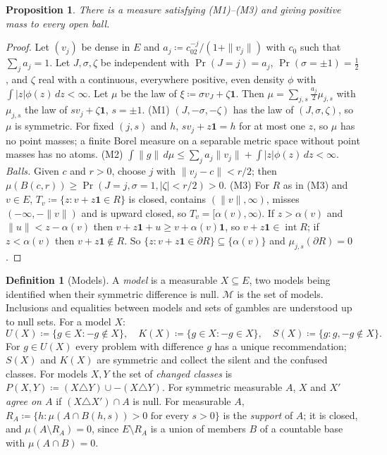 \documentclass[11pt]{article}
\newtheorem{proposition}[theorem]{Proposition}
\theoremstyle{definition}
\newtheorem{definition}[theorem]{Definition}
\theoremstyle{remark}
\newcommand{\M}{\mathcal M}
\newcommand{\one}{\mathbf 1}
\newcommand{\interior}{\operatorname{int}}
\newcommand{\bd}{\partial}
\begin{document}
\begin{proposition}\label{prop:existence-measure}
There is a measure satisfying (M1)--(M3) and giving positive mass to every open ball.
\end{proposition}
\begin{proof}
Let $(v_j)$ be dense in $E$ and $a_j\coloneqq c_02^{-j}/(1+\|v_j\|)$ with $c_0$ such that $\sum_ja_j=1$. Let $J,\sigma,\zeta$ be independent with $\Pr(J=j)=a_j$, $\Pr(\sigma=\pm1)=\frac12$, and $\zeta$ real with a continuous, everywhere positive, even density $\phi$ with $\int|z|\phi(z)\,dz<\infty$. Let $\mu$ be the law of $\xi\coloneqq\sigma v_J+\zeta\one$. Then $\mu=\sum_{j,s}\frac{a_j}2\mu_{j,s}$ with $\mu_{j,s}$ the law of $sv_j+\zeta\one$, $s=\pm1$.
(M1) $(J,-\sigma,-\zeta)$ has the law of $(J,\sigma,\zeta)$, so $\mu$ is symmetric. For fixed $(j,s)$ and $h$, $sv_j+z\one=h$ for at most one $z$, so $\mu$ has no point masses; a finite Borel measure on a separable metric space without point masses has no atoms.
(M2) $\int\|g\|\,d\mu\le\sum_ja_j\|v_j\|+\int|z|\phi(z)\,dz<\infty$.
\emph{Balls.} Given $c$ and $r>0$, choose $j$ with $\|v_j-c\|<r/2$; then $\mu(B(c,r))\ge\Pr(J=j,\sigma=1,|\zeta|<r/2)>0$.
(M3) For $R$ as in (M3) and $v\in E$, $T_v\coloneqq\{z:v+z\one\in R\}$ is closed, contains $(\|v\|,\infty)$, misses $(-\infty,-\|v\|)$ and is upward closed, so $T_v=[\alpha(v),\infty)$. If $z>\alpha(v)$ and $\|u\|<z-\alpha(v)$ then $v+z\one+u\ge v+\alpha(v)\one$, so $v+z\one\in\interior R$; if $z<\alpha(v)$ then $v+z\one\notin R$. So $\{z:v+z\one\in\bd R\}\subseteq\{\alpha(v)\}$ and $\mu_{j,s}(\bd R)=0$.
\end{proof}

\begin{definition}[Models]\label{def:models}
A \emph{model} is a measurable $X\subseteq E$, two models being identified when their symmetric difference is null. $\M$ is the set of models. Inclusions and equalities between models and sets of gambles are understood up to null sets. For a model $X$:
\[
U(X)\coloneqq\{g\in X:-g\notin X\},\quad K(X)\coloneqq\{g\in X:-g\in X\},\quad S(X)\coloneqq\{g:g,-g\notin X\}.
\]
For $g\in U(X)$ every problem with difference $g$ has a unique recommendation; $S(X)$ and $K(X)$ are symmetric and collect the silent and the confused classes. For models $X,Y$ the set of \emph{changed classes} is $P(X,Y)\coloneqq(X\triangle Y)\cup-(X\triangle Y)$. For symmetric measurable $A$, $X$ and $X'$ \emph{agree on $A$} if $(X\triangle X')\cap A$ is null. For measurable $A$, $R_A\coloneqq\{h:\mu(A\cap B(h,s))>0\text{ for every }s>0\}$ is the \emph{support} of $A$; it is closed, and $\mu(A\setminus R_A)=0$, since $E\setminus R_A$ is a union of members $B$ of a countable base with $\mu(A\cap B)=0$.
\end{definition}
\end{document}
